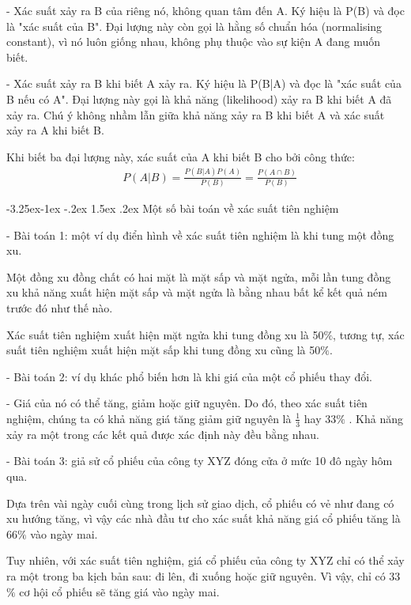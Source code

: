 \documentclass[a4paper]{article}
\makeatletter
\newcounter {subsubsubsection}[subsubsection]
\newcommand\subsubsubsection{\@startsection{subsubsubsection}{4}{\z@}%
                                     {-3.25ex\@plus -1ex \@minus -.2ex}%
                                     {1.5ex \@plus .2ex}%
                                     {\normalfont\normalsize\bfseries}}
\makeatother
\begin{document}
- Xác suất xảy ra B của riêng nó, không quan tâm đến A. Ký hiệu là P(B) và đọc là "xác suất của B". Đại lượng này còn gọi là hằng số chuẩn hóa (normalising constant), vì nó luôn giống nhau, không phụ thuộc vào sự kiện A đang muốn biết.

- Xác suất xảy ra B khi biết A xảy ra. Ký hiệu là P(B|A) và đọc là "xác suất của B nếu có A". Đại lượng này gọi là khả năng (likelihood) xảy ra B khi biết A đã xảy ra. Chú ý không nhầm lẫn giữa khả năng xảy ra B khi biết A và xác suất xảy ra A khi biết B.

Khi biết ba đại lượng này, xác suất của A khi biết B cho bởi công thức:
\begin{align}
	&P(A|B)=\frac{P(B|A)P(A)}{P(B)}=\frac{P(A\cap B)}{P(B)}
\end{align}




\subsubsubsection{Một số bài toán về xác suất tiên nghiệm}

	- Bài toán 1: một ví dụ điển hình về xác suất tiên nghiệm là khi tung một đồng xu.
	
	Một đồng xu đồng chất có hai mặt là mặt sấp và mặt ngửa, mỗi lần tung đồng xu khả năng xuất hiện mặt sấp và mặt ngửa là bằng nhau bất kể kết quả ném trước đó như thế nào. 
	
	
	
	Xác suất tiên nghiệm xuất hiện mặt ngửa khi tung đồng xu là 50$\%$, tương tự, xác suất tiên nghiệm xuất hiện mặt sấp khi tung đồng xu cũng là 50$\%$. 
	
	- Bài toán 2: ví dụ khác phổ biến hơn là khi giá của một cổ phiếu thay đổi. 
	
	- Giá của nó có thể tăng, giảm hoặc giữ nguyên. Do đó, theo xác suất tiên nghiệm, chúng ta có khả năng giá tăng  giảm  giữ nguyên là $\frac{1}{3}$ hay 33$\%$ . Khả năng xảy ra một trong các kết quả được xác định này đều bằng nhau.
	
	- Bài toán 3: giả sử cổ phiếu của công ty XYZ đóng cửa ở mức 10 đô ngày hôm qua. 
	
	Dựa trên vài ngày cuối cùng trong lịch sử giao dịch, cổ phiếu có vẻ như đang có xu hướng tăng, vì vậy các nhà đầu tư cho xác suất khả năng giá cổ phiếu tăng là 66$\%$ vào ngày mai.
	
	Tuy nhiên, với xác suất tiên nghiệm, giá cổ phiếu của công ty XYZ chỉ có thể xảy ra một trong ba kịch bản sau: đi lên, đi xuống hoặc giữ nguyên. Vì vậy, chỉ có 33$\%$ cơ hội cổ phiếu sẽ tăng giá vào ngày mai.   
	
\end{document}
